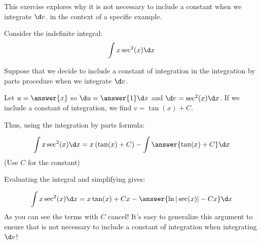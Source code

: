 \documentclass{ximera}
\author{Jim Talamo}
\begin{document}
\begin{exercise}
This exercise explores why it is not necessary to include a constant when we integrate $\d v$. in the context of a specific example.

Consider the indefinite integral:
\[
\int x \sec^2(x) \d x 
\]

Suppose that we decide to include a constant of integration in the integration by parts procedure when we integrate $\d v$.

Let $u=\answer{x}$ so $\d u =\answer{1} \d x$ and $\d v = \sec^2(x) \d x$.  If we include a constant of integration, we find $v = \tan(x)+C$.

Thus, using the integration by parts formula:

\[
\int x \sec^2(x) \d x = x \left( \tan(x) +C \right) - \int \answer{\tan(x) +C} \d x
\]
(Use $C$ for the constant)

\begin{exercise}

Evaluating the integral and simplifying gives:

\[
\int x \sec^2(x) \d x = x \tan(x) +Cx - \answer{\ln|\sec(x)| - Cx} \d x
\]
As you can see the terms with $C$ cancel!  It's easy to generalize this argument to ensure that is not necessary to include a constant of integration when integrating $\d v$!

\end{exercise}
\end{exercise}
\end{document}
